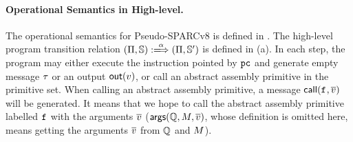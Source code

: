 \paragraph{\textbf{Operational Semantics in High-level.}}
The operational semantics for Pseudo-SPARCv8
is defined in \Fig{\ref{fig:selected-opsem-high-level-prog}}.
The high-level program transition relation
$\HGlobTrans{(\HMd, \hpstate)}{\hmsg}{(\HMd, \hpstate')}$ is defined
in \Fig{\ref{fig:selected-opsem-high-level-prog}} (a). In each step,
the program may either execute the instruction pointed by $\texttt{pc}$
and generate empty message $\tau$ or an output $\textsf{out}({v})$,
or call an abstract assembly primitive in the primitive set.
When calling an abstract assembly primitive,
a message $\textsf{call}({\texttt{f}_{}, \overline{v}})$ will be generated. 
It means that we
hope to call the abstract assembly primitive labelled
$\texttt{f}_{}$ with the arguments $\overline{v}$ 
($\textsf{args}(\mathbb{Q}, M, \overline{v})$, whose definition
is omitted here, means getting the arguments $\overline{v}$
from $\mathbb{Q}$ and $M$).

